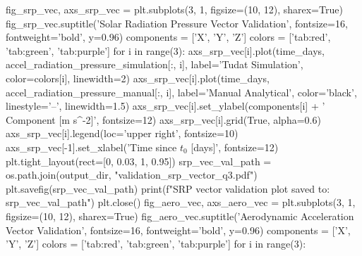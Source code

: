 \markdownRendererHeadingOne{-------------------------------------------------------------------------}\markdownRendererInterblockSeparator
{}fig_srp_vec, axs_srp_vec = plt.subplots(3, 1, figsize=(10, 12), sharex=True) fig_srp_vec.suptitle('Solar Radiation Pressure Vector Validation', fontsize=16, fontweight='bold', y=0.96) components = ['X', 'Y', 'Z'] colors = ['tab:red', 'tab:green', 'tab:purple'] for i in range(3):\markdownRendererInterblockSeparator
{}
\markdownRendererSectionEnd \markdownRendererSectionBegin
{}\markdownRendererInterblockSeparator
{}axs_srp_vec[i].plot(time_days, accel_radiation_pressure_simulation[:, i], label='Tudat Simulation', color=colors[i], linewidth=2)\markdownRendererInterblockSeparator
{}
\markdownRendererSectionEnd \markdownRendererSectionBegin
{}\markdownRendererInterblockSeparator
{}axs_srp_vec[i].plot(time_days, accel_radiation_pressure_manual[:, i], label='Manual Analytical', color='black', linestyle='--', linewidth=1.5) axs_srp_vec[i].set_ylabel(components[i] + ' Component [m s^-2]', fontsize=12) axs_srp_vec[i].grid(True, alpha=0.6) axs_srp_vec[i].legend(loc='upper right', fontsize=10) axs_srp_vec[-1].set_xlabel('Time since $t_0$ [days]', fontsize=12) plt.tight_layout(rect=[0, 0.03, 1, 0.95]) srp_vec_val_path = os.path.join(output_dir, "validation_srp_vector_q3.pdf") plt.savefig(srp_vec_val_path) print(f"SRP vector validation plot saved to: {srp_vec_val_path}") plt.close()\markdownRendererInterblockSeparator
{}
\markdownRendererSectionEnd \markdownRendererSectionBegin
\markdownRendererHeadingOne{-------------------------------------------------------------------------}\markdownRendererInterblockSeparator
{}
\markdownRendererSectionEnd \markdownRendererSectionBegin
{}\markdownRendererInterblockSeparator
{}
\markdownRendererSectionEnd \markdownRendererSectionBegin
\markdownRendererHeadingOne{-------------------------------------------------------------------------}\markdownRendererInterblockSeparator
{}fig_aero_vec, axs_aero_vec = plt.subplots(3, 1, figsize=(10, 12), sharex=True) fig_aero_vec.suptitle('Aerodynamic Acceleration Vector Validation', fontsize=16, fontweight='bold', y=0.96) components = ['X', 'Y', 'Z'] colors = ['tab:red', 'tab:green', 'tab:purple'] for i in range(3):\markdownRendererInterblockSeparator
{}
\markdownRendererSectionEnd \markdownRendererSectionBegin
{}\markdownRendererInterblockSeparator
